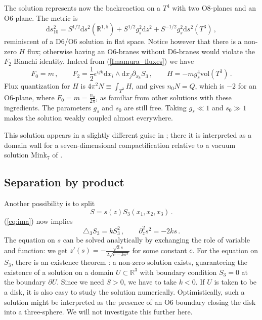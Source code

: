 \documentclass[12pt]{article}
\newcommand{\R}{\mathbb{R}}
\newcommand{\dd}{\mathrm{d}}
\newcommand{\vol}{\mathrm{vol}}
\begin{document}
The solution represents now the backreaction on a $T^4$ with two O8-planes and an O6-plane. The metric is 
\begin{equation}
\label{eq:sep-sum-met}
\dd s^2_{10} = S^{1/2} \dd s^2 (\R^{1,5})+ S^{1/2} g_s^2 \dd z^2+ S^{-1/2} g_s^2 \dd s^2(T^3) \, ,
\end{equation}
reminiscent of a D6/O6 solution in flat space. Notice however that there is a non-zero $H$ flux;  otherwise having an O6-branes without D6-branes would violate the $F_2$ Bianchi identity. Indeed from (\ref{Imamura_fluxes}) we have
\begin{equation}
	  F_0 = m \, ,\qquad F_2 = \frac{1}{2} \epsilon^{ijk} \dd x_i \wedge \dd x_j \partial_{x_k} S_3 \, ,\qquad H = -m g_s^4\vol(T^3)\,.
\end{equation}
Flux quantization for $H$ is $4\pi^2 N\equiv \int_{T^3} H$, and gives $n_0 N=Q$, which is $-2$ for an O6-plane, where $F_0 = m = \frac{n_0}{2\pi}$, as familiar from other solutions with these ingredients.  The parameters $g_s$ and $s_0$ are still free. Taking $g_s \ll 1$ and $s_0 \gg 1$ makes the solution weakly coupled almost everywhere.  

This solution appears in a slightly different guise in \cite{blaback-vanderwoerd-vanriet-williams,blaback-janssen-vanriet-vercnocke}; there it is interpreted as a domain wall for a seven-dimensional compactification relative to a vacuum solution Mink$_7$ of \cite{blaback-danielsson-junghans-vanriet-wrase-zagermann}.



\subsection{Separation by product} \label{sub:sep-prod}

Another possibility is to split 
\begin{equation}
  	S= s(z) S_3(x_1,x_2,x_3) \, .
\end{equation}
(\ref{eq:ima}) now implies
\begin{equation}
\triangle_3 S_3 = k S_3^2 \, , \qquad \partial_z^2 s^2 = -2k s \, .
\end{equation}
The equation on $s$ can be solved analytically by exchanging the role of variable and function: we get $z'(s)=-\frac{\sqrt 3 s}{2 \sqrt{c -k s^3}}$ for some constant $c$. For the equation on $S_3$, there is an existence theorem \cite[Sec.~8.5.2]{evans}: a non-zero solution exists, guaranteeing the existence of a solution on a domain $U\subset \mathbb{R}^3$ with boundary condition $S_3=0$ at the boundary $\partial U$. Since we need $S>0$, we have to take $k<0$. 
If $U$ is taken to be a disk, it is also easy to study the solution numerically. Optimistically, such a solution might be interpreted as the presence of an O6 boundary closing the disk into a three-sphere. We will not investigate this further here.
\end{document}
